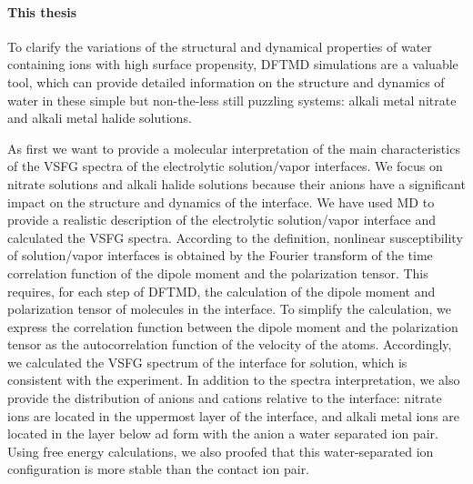 \paragraph{This thesis}
%
To clarify the variations of the structural and dynamical properties 
of water containing ions with high surface propensity, DFTMD simulations are a valuable tool, 
which can provide detailed information on the structure and dynamics  
of water in these simple but non-the-less still puzzling systems: alkali metal nitrate and alkali metal halide solutions\cite{KM98}.

As first we want to provide a molecular interpretation of the main characteristics of the
VSFG spectra of the electrolytic solution/vapor interfaces.
We focus on nitrate solutions and alkali halide solutions because their anions have a significant impact on the structure and dynamics of the interface.
We have used \abinitio MD to provide a realistic description of the electrolytic solution/vapor interface and calculated the VSFG spectra.
According to the definition, nonlinear susceptibility of solution/vapor interfaces is obtained by the Fourier transform of 
the time correlation function of the dipole moment and the polarization tensor. This requires, for each step of DFTMD, 
the calculation of the dipole moment and polarization tensor of molecules in the interface. 
To simplify the calculation, we express the correlation function between the dipole moment and the polarization tensor 
as the autocorrelation function of the velocity of the atoms. 
Accordingly, we calculated the VSFG spectrum of the interface for \LiN solution,
which is consistent with the experiment. 
In addition to the spectra interpretation, we also provide the distribution of anions 
and cations relative to the interface: nitrate ions are located in the uppermost layer of the interface, 
and alkali metal ions are located in the layer below ad form with the anion a water separated ion pair. 
Using free energy calculations, we also proofed that this water-separated ion configuration is more stable than the contact ion pair.

